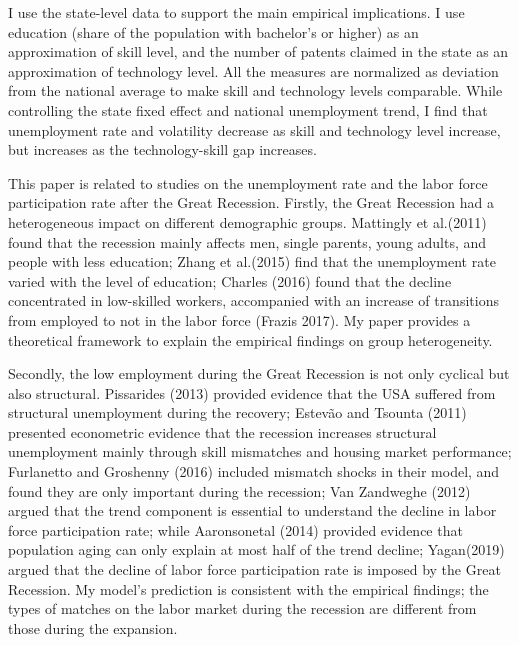 \documentclass[12pt]{article}
\newcommand{\1}{\mathbb{1}}
\begin{document}
I use the state-level data to support the main empirical implications. I use education (share of the population with bachelor's or higher) as an approximation of skill level, and the number of patents claimed in the state as an approximation of technology level. All the measures are normalized as deviation from the national average to make skill and technology levels comparable. While controlling the state fixed effect and national unemployment trend, I find that unemployment rate and volatility decrease as skill and technology level increase, but increases as the technology-skill gap increases. 

This paper is related to studies on the unemployment rate and the labor force participation rate after the Great Recession. 
Firstly, the Great Recession had a heterogeneous impact on different demographic groups. 
Mattingly et al.(2011)\nocite{Mattinglyetal2011} found that the recession mainly affects men, single parents, young adults, and people with less education;
Zhang et al.(2015)\nocite{Zhangetal2015} find that the unemployment rate varied with the level of education; 
Charles (2016)\nocite{Charles2016} found that the decline concentrated in low-skilled workers, accompanied with an increase of transitions from employed to not in the labor force (Frazis 2017\nocite{Frazis2017}). 
My paper provides a theoretical framework to explain the empirical findings on group heterogeneity.   

Secondly, the low employment during the Great Recession is not only cyclical but also structural. 
Pissarides (2013)\nocite{Pissarides2013} provided evidence that the USA suffered from structural unemployment during the recovery;
Estev{\~a}o and Tsounta (2011)\nocite{EstevaoTsounta2011} presented econometric evidence that the recession increases structural unemployment mainly through skill mismatches and housing market performance;
Furlanetto and Groshenny (2016)\nocite{FurlanettoGroshenny2016} included mismatch shocks in their model, and found they are only important during the recession;
Van Zandweghe (2012)\nocite{VanZandweghe2012} argued that the trend component is essential to understand the decline in labor force participation rate;
while Aaronsonetal (2014)\nocite{Aaronsonetal2014} provided evidence that population aging can only explain at most half of the trend decline;
Yagan(2019)\nocite{Yagan2019} argued that the decline of labor force participation rate is imposed by the Great Recession.
My model's prediction is consistent with the empirical findings; the types of matches on the labor market during the recession are different from those during the expansion.  
\end{document}
